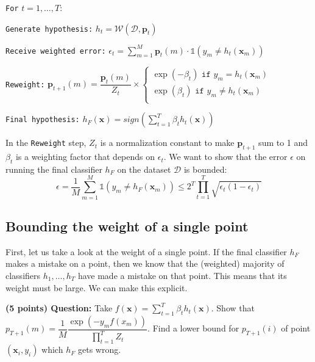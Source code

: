 \documentclass{article}
\begin{document}
\vspace{2mm}
\texttt{For} $t = 1, \hdots, T:$

\vspace{2mm}
\hspace{5mm} \texttt{Generate hypothesis:} $h_t = \mathcal{W}(\mathcal{D}, \mathbf{p}_t)$

\vspace{2mm}
\hspace{5mm} \texttt{Receive weighted error:} $\epsilon_t = \sum\limits_{m=1}^M \mathbf{p}_t(m) \cdot \mathds{1}(y_m \neq h_t(\mathbf{x}_m))$


\vspace{2mm}
\hspace{5mm} \texttt{Reweight:} $\mathbf{p}_{t+1}(m) = \dfrac{\mathbf{p}_t(m)}{Z_t} \times \begin{cases} \exp(-\beta_t) \texttt{ if } y_m = h_t(\mathbf{x}_m)\\ \exp(\beta_t) \texttt{ if } y_m \neq h_t(\mathbf{x}_m)\\ \end{cases}$

\vspace{2mm}
\texttt{Final hypothesis:} $h_F(\mathbf{x}) = sign\left(\sum\limits_{t=1}^T \beta_t h_t(\mathbf{x})\right)$

\vspace{2mm}
\noindent In the \texttt{Reweight} step, $Z_t$ is a normalization constant to make $\mathbf{p}_{t+1}$ sum to 1 and $\beta_t$ is a weighting factor that depends on $\epsilon_t$. We want to show that the error $\epsilon$ on running the final classifier $h_F$ on the dataset $\mathcal{D}$ is bounded:
$$\epsilon = \dfrac{1}{M} \sum\limits_{m=1}^M \mathds{1}(y_m \neq h_F(\mathbf{x}_m)) \leq 2^T  \prod\limits_{t=1}^T \sqrt{\epsilon_t (1-\epsilon_t)}$$

\subsection{Bounding the weight of a single point}

First, let us take a look at the weight of a single point.
If the final classifier $h_F$ makes a mistake on a point, then we know that the (weighted) majority of classifiers $h_1, \hdots, h_T$ have made a mistake on that point.
This means that its weight must be large.
We can make this explicit.

\noindent\textbf{(5 points) Question:} Take $f(\mathbf{x}) = \sum\limits_{t=1}^T\beta_t h_t(\mathbf{x})$. Show that $p_{T+1}(m) = \dfrac{1}{M}\dfrac{\exp(-y_m f(x_m))}{\prod_{t=1}^T Z_t}$. Find a lower bound for $p_{T+1}(i)$ of point $(\mathbf{x}_i,y_i)$ which $h_F$ gets wrong.
\end{document}
